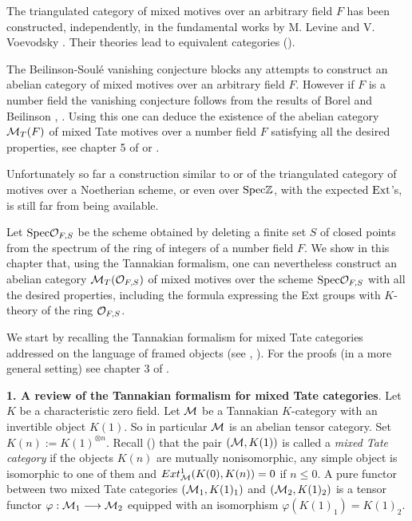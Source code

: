 \documentclass[10pt]{article}
\begin{document}
The triangulated category of mixed motives over an arbitrary 
 field $F$ 
 has been constructed, independently, in the fundamental works by M. Levine \cite{L} and 
V. Voevodsky \cite{V}. Their theories lead to  equivalent categories (\cite{L}). 

The Beilinson-Soul\'e vanishing conjecture blocks any attempts 
to construct an abelian category of mixed motives over  an arbitrary 
 field $F$. 
However if $F$ is a number field 
the vanishing conjecture follows from  the results of Borel and Beilinson \cite{Bo}, \cite{Be1}. 
Using this one can deduce 
the existence of 
the abelian category ${\cal M}_T(F)$ of mixed Tate motives 
over a number field $F$ satisfying all the desired properties, see chapter 5 of \cite{G8} or \cite{L1}. 

Unfortunately  so far a construction similar to \cite{L} or \cite{V} of the triangulated category of 
motives over a 
Noetherian scheme, or even over ${\rm Spec}{\mathbb Z}$, with the expected ${\rm Ext}$'s,  
is still far from being available. 

Let ${\rm Spec}{\cal O}_{F, S}$ be the scheme obtained by deleting 
a finite set $S$  of closed points from the spectrum of the 
ring of integers of a number field $F$. We  show in this chapter that, 
using the Tannakian formalism,  one can nevertheless construct an abelian category 
${\cal M}_T({\cal O}_{F, S})$ 
of mixed motives over the scheme ${\rm Spec}{\cal O}_{F, S}$ 
with all the desired properties, 
including the formula expressing the Ext groups with $K$-theory 
of the ring ${\cal O}_{F, S}$.

 
We start  by  recalling
 the Tannakian formalism for mixed Tate categories addressed on the language 
of framed objects (see \cite{BMS}, \cite{BGSV}).  
For the  proofs (in a more  general setting) see chapter 3 of \cite{G9}. 


{\bf 1. A review of the Tannakian formalism for mixed Tate categories}. Let $K$ be a characteristic zero field. 
Let ${\cal M}$ be a Tannakian  $K$-category with an invertible object $K(1)$. So 
in particular ${\cal M}$ is an abelian tensor  category. 
Set $K(n):= K(1)^{\otimes n}$. 
Recall (\cite{BD2}) that the pair $({\cal M}, K(1))$ is called a {\it mixed Tate category} 
if the objects $K(n)$
are mutually nonisomorphic, any simple object is isomorphic to one of them and
$Ext_{{\cal M}}^1(K(0),K(n)) = 0$ if $n \leq 0$. A pure functor 
between two mixed Tate categories $({\cal M}_1, K(1)_1)$ and $({\cal M}_2, K(1)_2)$ is a 
tensor functor $\varphi: {\cal M}_1 \longrightarrow {\cal M}_2$  equipped 
with an isomorphism $\varphi(K(1)_1) = K(1)_2$. 
\end{document}
